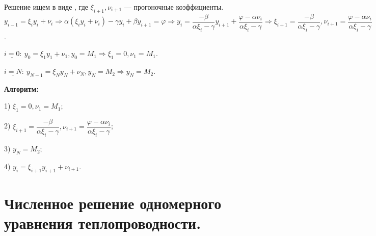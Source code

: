 \documentclass[9pt]{article}
\begin{document}
Решение ищем в виде , где \(\xi_{i+1},\nu_{i+1}\) --- прогоночные коэффициенты. \(y_{i-1}=\xi_iy_i+\nu_i\Rightarrow\alpha(\xi_iy_i+\nu_i)-\gamma y_i+\beta y_{i+1}=\varphi\Rightarrow y_i=\dfrac{-\beta}{\alpha\xi_i-\gamma}y_{i+1}+\dfrac{\varphi-\alpha\nu_i}{\alpha\xi_i-\gamma}\Rightarrow\xi_{i+1}=\dfrac{-\beta}{\alpha\xi_i-\gamma},\nu_{i+1}=\dfrac{\varphi-\alpha\nu_i}{\alpha\xi_i-\gamma}\).
\par\(\underline{i=0}:\ y_0=\xi_1y_1+\nu_1, y_0=M_1\Rightarrow\xi_1=0,\nu_1=M_1\).
\par\(\underline{i=N}:\ y_{N-1}=\xi_Ny_N+\nu_N,y_N=M_2\Rightarrow y_N=M_2\).
\par\textbf{Алгоритм:}
\par1) \(\xi_1=0,\nu_1=M_1\);
\par2) \(\xi_{i+1}=\dfrac{-\beta}{\alpha\xi_i-\gamma},\nu_{i+1}=\dfrac{\varphi-\alpha\nu_i}{\alpha\xi_i-\gamma}\);
\par3) \(y_N=M_2\);
\par4) \(y_i=\xi_{i+1}y_{i+1}+\nu_{i+1}\).

\section{Численное решение одномерного уравнения теплопроводности.}
\end{document}
